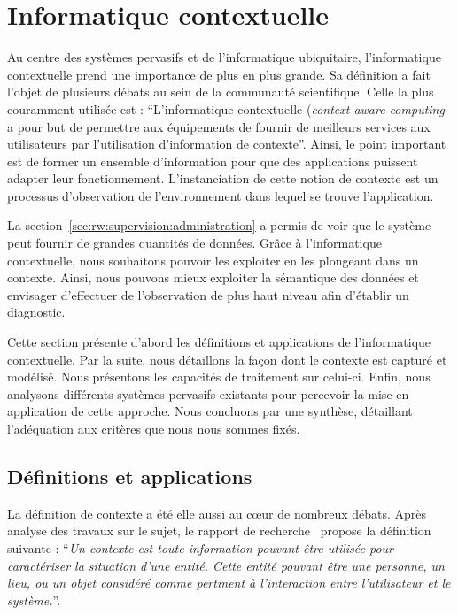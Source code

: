 \section{Informatique contextuelle}\label{sec:rw:supervision:contexte}
Au centre des systèmes pervasifs et de l'informatique ubiquitaire, l'informatique contextuelle prend une importance de plus en plus grande. Sa définition a fait l'objet de plusieurs débats au sein de la communauté scientifique. Celle la plus couramment utilisée est : \enquote{L'informatique contextuelle (\textit{context-aware computing} a pour but de permettre aux équipements de fournir de meilleurs services aux utilisateurs par l'utilisation d'information de contexte}\cite{Han:contextaware}. Ainsi, le point important est de former un ensemble d'information pour que des applications puissent adapter leur fonctionnement. L'instanciation de cette notion de contexte est un processus d'observation de l'environnement dans lequel se trouve l'application.

La section~\ref{sec:rw:supervision:administration} a permis de voir que le système peut fournir de grandes quantités de données. Grâce à l'informatique contextuelle, nous souhaitons pouvoir les exploiter en les plongeant dans un contexte. Ainsi, nous pouvons mieux exploiter la sémantique des données et envisager d’effectuer de l'observation de plus haut niveau afin d'établir un diagnostic.

Cette section présente d'abord les définitions et applications de l'informatique contextuelle. Par la suite, nous détaillons la façon dont le contexte est capturé et modélisé. Nous présentons les capacités de traitement sur celui-ci. Enfin, nous analysons différents systèmes pervasifs existants pour percevoir la mise en application de cette approche. Nous concluons par une synthèse, détaillant l'adéquation aux critères que nous nous sommes fixés.

\subsection{Définitions et applications}
La définition de contexte a été elle aussi au cœur de nombreux débats. Après analyse des travaux sur le sujet, le rapport de recherche~\cite{Dey:context} propose la définition suivante : \enquote{\it Un contexte est toute information pouvant être utilisée pour caractériser la situation d'une entité. Cette entité pouvant être une personne, un lieu, ou un objet considéré comme pertinent à l'interaction entre l'utilisateur et le système.}.

